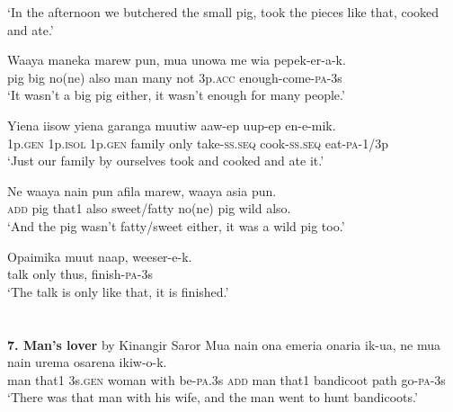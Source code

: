{\glt ‘In the afternoon we butchered the small pig, took the pieces like that, cooked and ate.’ \\
\z


\ea\label{ex:a:x28}
\gll  Waaya  maneka  marew  pun,  mua  unowa  me  wia  pepek-er-a-k. \\
pig  big  no(ne)  also  man  many  not  3p.\textsc{acc}  enough-come-\textsc{pa}-3s \\
\glt ‘It wasn’t a big pig either, it wasn’t enough for many people.’ \\
\z


\ea\label{ex:a:x29}
\gll  Yiena  iisow  yiena  garanga  muutiw  aaw-ep  uup-ep         en-e-mik. \\
1p.\textsc{gen}  1p.\textsc{isol}  1p.\textsc{gen}  family  only  take-\textsc{ss.seq}  cook-\textsc{ss.seq}    eat-\textsc{pa}-1/3p \\


\glt ‘Just our family by ourselves took and cooked and ate it.’ \\
\z


\ea\label{ex:a:x30}
\gll  Ne  waaya  nain  pun  afila  marew,  waaya  asia  pun. \\
\textsc{add}  pig  that1  also  sweet/fatty  no(ne)  pig  wild  also. \\
\glt ‘And the pig wasn’t fatty/sweet either, it was a wild pig too.’ \\
\z


\ea\label{ex:a:x31}
\gll  Opaimika  muut  naap,  weeser-e-k. \\
talk  only  thus,  finish-\textsc{pa}-3s \\
\glt ‘The talk is only like that, it is finished.’ \\
\z


\section{}
\textbf{7. Man’s lover}  by Kinangir Saror
\ea\label{ex:a:x2}
\gll  Mua  nain  ona  emeria  onaria  ik-ua,  ne  mua  nain  urema  osarena  ikiw-o-k. \\
man  that1  3s.\textsc{gen}  woman  with  be-\textsc{pa}.3s  \textsc{add}  man  that1  bandicoot  path  go-\textsc{pa}-3s \\


\glt ‘There was that man with his wife, and the man went to hunt bandicoots.’ \\
\z


}
